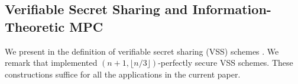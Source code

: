 \subsection{Verifiable Secret Sharing and Information-Theoretic MPC}

 We present in  the definition of verifiable secret sharing (VSS) schemes \cite{FOCS:CGMA85}. We remark that \cite{STOC:BenGolWig88,EC:CDDHR99} implemented $(n+1, \lfloor n/3 \rfloor)$-perfectly secure VSS schemes. These constructions suffice for all the applications in the current paper.
